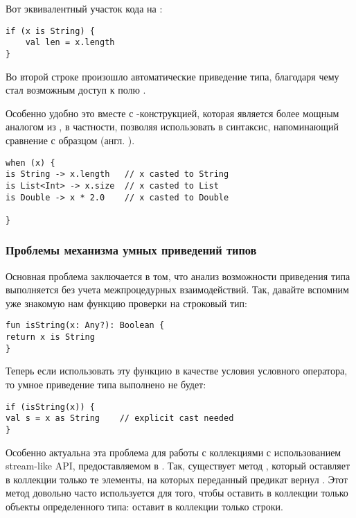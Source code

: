 Вот эквивалентный участок кода на :

\begin{verbatim}
if (x is String) {
    val len = x.length
}
\end{verbatim}

Во второй строке произошло автоматические приведение типа, благодаря чему стал возможным доступ к полю .

Особенно удобно это вместе с -конструкцией, которая является более мощным аналогом  из , в частности, позволяя использовать в  синтаксис, напоминающий сравнение с образцом (англ. ).

\begin{verbatim}
when (x) {
is String -> x.length   // x casted to String
is List<Int> -> x.size  // x casted to List
is Double -> x * 2.0    // x casted to Double

}
\end{verbatim}




\subsubsection{Проблемы механизма умных приведений типов}

Основная проблема заключается в том, что анализ возможности приведения типа выполняется без учета межпроцедурных взаимодействий. Так, давайте вспомним уже знакомую нам функцию проверки на строковый тип:

\begin{verbatim}
fun isString(x: Any?): Boolean {
return x is String
}
\end{verbatim}

Теперь если использовать эту функцию в качестве условия условного оператора, то умное приведение типа выполнено не будет:

\begin{verbatim}
if (isString(x)) {
val s = x as String    // explicit cast needed
}
\end{verbatim}

Особенно актуальна эта проблема для работы с коллекциями с использованием stream-like API, предоставляемом в . Так, существует метод , который оставляет в коллекции только те элементы, на которых переданный предикат вернул . Этот метод довольно часто используется для того, чтобы оставить в коллекции только объекты определенного типа:  оставит в коллекции  только строки.

